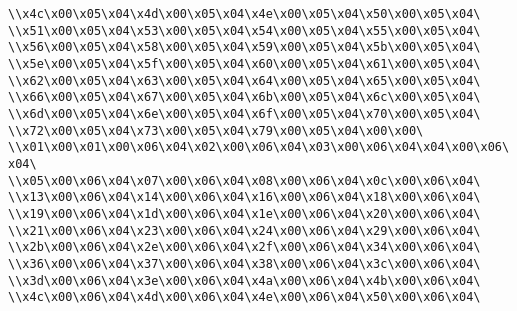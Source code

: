 \verb|\\x4c\x00\x05\x04\x4d\x00\x05\x04\x4e\x00\x05\x04\x50\x00\x05\x04\|\newline
\verb|\\x51\x00\x05\x04\x53\x00\x05\x04\x54\x00\x05\x04\x55\x00\x05\x04\|\newline
\verb|\\x56\x00\x05\x04\x58\x00\x05\x04\x59\x00\x05\x04\x5b\x00\x05\x04\|\newline
\verb|\\x5e\x00\x05\x04\x5f\x00\x05\x04\x60\x00\x05\x04\x61\x00\x05\x04\|\newline
\verb|\\x62\x00\x05\x04\x63\x00\x05\x04\x64\x00\x05\x04\x65\x00\x05\x04\|\newline
\verb|\\x66\x00\x05\x04\x67\x00\x05\x04\x6b\x00\x05\x04\x6c\x00\x05\x04\|\newline
\verb|\\x6d\x00\x05\x04\x6e\x00\x05\x04\x6f\x00\x05\x04\x70\x00\x05\x04\|\newline
\verb|\\x72\x00\x05\x04\x73\x00\x05\x04\x79\x00\x05\x04\x00\x00\|\newline
\verb|\\x01\x00\x01\x00\x06\x04\x02\x00\x06\x04\x03\x00\x06\x04\x04\x00\x06\x04\|\newline
\verb|\\x05\x00\x06\x04\x07\x00\x06\x04\x08\x00\x06\x04\x0c\x00\x06\x04\|\newline
\verb|\\x13\x00\x06\x04\x14\x00\x06\x04\x16\x00\x06\x04\x18\x00\x06\x04\|\newline
\verb|\\x19\x00\x06\x04\x1d\x00\x06\x04\x1e\x00\x06\x04\x20\x00\x06\x04\|\newline
\verb|\\x21\x00\x06\x04\x23\x00\x06\x04\x24\x00\x06\x04\x29\x00\x06\x04\|\newline
\verb|\\x2b\x00\x06\x04\x2e\x00\x06\x04\x2f\x00\x06\x04\x34\x00\x06\x04\|\newline
\verb|\\x36\x00\x06\x04\x37\x00\x06\x04\x38\x00\x06\x04\x3c\x00\x06\x04\|\newline
\verb|\\x3d\x00\x06\x04\x3e\x00\x06\x04\x4a\x00\x06\x04\x4b\x00\x06\x04\|\newline
\verb|\\x4c\x00\x06\x04\x4d\x00\x06\x04\x4e\x00\x06\x04\x50\x00\x06\x04\|\newline
